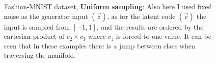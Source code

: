 \documentclass[letterpaper,12pt]{article}
\begin{document}
\begin{figure}[H]       
    \hspace{30px}
    \hspace{30px}
    \caption{Fashion-MNIST dataset, \textbf{Uniform sampling}: Also here I used fixed noise as the generator input $(\vec{z})$, as for the latent code $(\vec{c})$ the input is sampled from $[-1,1]$, and the results are ordered by the cartesian product of \( c_2 \times c_3\) where \(c_1\) is forced to one value. It can be seen that in these examples there is a jump between class when traversing the manifold.}
    \label{fashion_mnist_1}
\end{figure}
\end{document}
